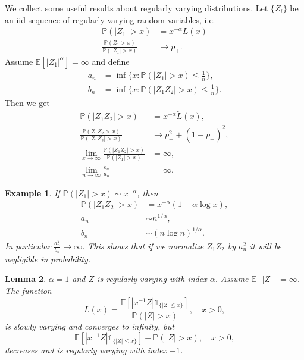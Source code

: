 \documentclass[11pt,reqno]{amsart}
\newcommand{\E}{\mathbb{E}}
\renewcommand{\P}{\mathbb{P}}
\newcommand{\1}{\mathds{1}}
\newcommand{\0}{\boldsymbol{0}}
\newcommand{\4}{\mathchoice{\mskip1.5mu}{\mskip1.5mu}{}{}}
\newcommand{\5}{\mathchoice{\mskip-1.5mu}{\mskip-1.5mu}{}{}}
\newcommand{\2}{\penalty250\mskip\thickmuskip\mskip-\thinmuskip} %
\newtheorem{lemma}{Lemma}[section]
\newtheorem{example}[lemma]{Example}
\begin{document}
We collect some useful results about regularly varying distributions. Let $\{Z_i\}$ be an iid sequence of regularly varying random variables, i.e.
\begin{equation*}
\begin{split}
\P(|Z_1|>x) &= x^{-\alpha} L(x)\\
\frac{\P(Z_1>x)}{\P(|Z_1|>x)}&\to p_+.
\end{split}
\end{equation*} 
Assume $\E[|Z_1|^\alpha]=\infty$ and define 
\begin{equation*}
\begin{split}
a_n &=\inf\{x: \P(|Z_1|>x) \leq \frac{1}{n} \},\\
b_n &=\inf\{x: \P(|Z_1Z_2|>x) \leq \frac{1}{n} \}.
\end{split}
\end{equation*} 
Then we get
\begin{equation*}
\begin{split}
\P(|Z_1Z_2|>x) &= x^{-\alpha} \tilde{L}(x),\\
\frac{\P(Z_1Z_2>x)}{\P(|Z_1Z_2|>x)} &\to p_+^2+(1-p_+)^2,\\
\lim_{x\to \infty}\frac{\P(|Z_1Z_2|>x)}{\P(|Z_1|>x)} &= \infty,\\
\lim_{n\to\infty} \frac{b_n}{a_n}&= \infty.
\end{split}
\end{equation*}

\begin{example}
If $\P(|Z_1|>x) \sim x^{-\alpha}$, then
\begin{equation*}
\begin{split}
\P(|Z_1Z_2|>x) &= x^{-\alpha} (1+\alpha \log x),\\
a_n &\sim n^{1/\alpha},\\
b_n &\sim (n \log n)^{1/\alpha}.
\end{split}
\end{equation*}
In particular $\frac{a_n^2}{b_n}\to \infty$. This shows that if we normalize $Z_1 Z_2$ by $a_n^2$ it will be negligible in probability. 
\end{example}

\begin{lemma}
$\alpha=1$ and $Z$ is regularly varying with index $\alpha$. Assume $\E[|Z|]=\infty$. The function
\begin{equation*}
L(x)=\frac{\E[|x^{-1} Z |\1_{\{|Z|\leq x\}}]}{\P(|Z|>x)},\quad x>0,
\end{equation*}
is slowly varying and converges to infinity, but
\begin{equation*}
\E[|x^{-1} Z |\1_{\{|Z|\leq x\}}]+\P(|Z|>x),\quad x>0,
\end{equation*}
decreases and is regularly varying with index $-1$.
\end{lemma}
\end{document}
